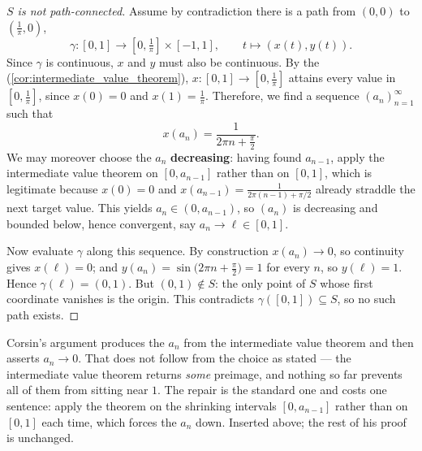 \begin{proof}[$S$ is not path-connected]
Assume by contradiction there is a path from $(0,0)$ to $(\tfrac{1}{\pi}, 0)$,
\[
\gamma : [0,1] \to [0, \tfrac{1}{\pi}] \times [-1,1], \qquad t \mapsto (x(t), y(t)).
\]
Since $\gamma$ is continuous, $x$ and $y$ must also be continuous. By the  (\cref{cor:intermediate_value_theorem}), $x : [0,1] \to [0,\tfrac{1}{\pi}]$
attains every value in $[0,\tfrac{1}{\pi}]$, since $x(0) = 0$ and $x(1) = \tfrac{1}{\pi}$.
Therefore, we find a sequence $(a_n)_{n=1}^{\infty}$ such that
\[
x(a_n) = \frac{1}{2\pi n + \tfrac{\pi}{2}}.
\]
We may moreover choose the $a_n$ \textbf{decreasing}: having found $a_{n-1}$, apply the
intermediate value theorem on $[0,a_{n-1}]$ rather than on $[0,1]$, which is legitimate because
$x(0) = 0$ and $x(a_{n-1}) = \tfrac{1}{2\pi(n-1)+\pi/2}$ already straddle the next target value.
This yields $a_n \in (0,a_{n-1})$, so $(a_n)$ is decreasing and bounded below, hence convergent,
say $a_n \to \ell \in [0,1]$.

Now evaluate $\gamma$ along this sequence. By construction $x(a_n) \to 0$, so continuity gives
$x(\ell) = 0$; and $y(a_n) = \sin\!\big(2\pi n + \tfrac\pi2\big) = 1$ for every $n$, so
$y(\ell) = 1$. Hence $\gamma(\ell) = (0,1)$. But $(0,1) \notin S$: the only point of $S$ whose
first coordinate vanishes is the origin. This contradicts $\gamma([0,1]) \subseteq S$, so no
such path exists.
\end{proof}

\begin{ainote}
Corsin's argument produces the $a_n$ from the intermediate value theorem and then asserts
$a_n \to 0$. That does not follow from the choice as stated --- the intermediate value theorem
returns \emph{some} preimage, and nothing so far prevents all of them from sitting near $1$.
The repair is the standard one and costs one sentence: apply the theorem on the shrinking
intervals $[0,a_{n-1}]$ rather than on $[0,1]$ each time, which forces the $a_n$ down. Inserted
above; the rest of his proof is unchanged.
\end{ainote}

